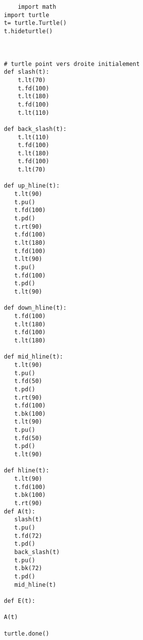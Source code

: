 \sol
\begin{verbatim}
    import math
import turtle
t= turtle.Turtle()
t.hideturtle()

   

# turtle point vers droite initialement 
def slash(t):
    t.lt(70)
    t.fd(100)
    t.lt(180)
    t.fd(100)
    t.lt(110)

def back_slash(t):
    t.lt(110)
    t.fd(100)
    t.lt(180)
    t.fd(100)
    t.lt(70)

def up_hline(t):
   t.lt(90) 
   t.pu()
   t.fd(100)
   t.pd()
   t.rt(90)
   t.fd(100)
   t.lt(180)
   t.fd(100)
   t.lt(90)
   t.pu()
   t.fd(100)
   t.pd()
   t.lt(90)

def down_hline(t):
   t.fd(100)
   t.lt(180)
   t.fd(100)
   t.lt(180)

def mid_hline(t):
   t.lt(90) 
   t.pu()
   t.fd(50)
   t.pd()
   t.rt(90)
   t.fd(100)
   t.bk(100)
   t.lt(90)
   t.pu()
   t.fd(50)
   t.pd()
   t.lt(90)

def hline(t):
   t.lt(90)
   t.fd(100)
   t.bk(100)
   t.rt(90)
def A(t):
   slash(t)
   t.pu()
   t.fd(72)
   t.pd()
   back_slash(t)
   t.pu()
   t.bk(72)
   t.pd()
   mid_hline(t)

def E(t):

A(t)

turtle.done()
\end{verbatim}
